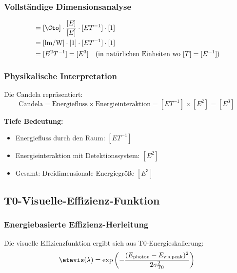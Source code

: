 	\subsubsection{Vollständige Dimensionsanalyse}
	\label{subsubsec:candela_vollstaendige_dimensional}
	
	\begin{align}
		[I_{\text{T0}}] &= [\Cto] \cdot \frac{[E]}{[E]} \cdot [E T^{-1}] \cdot [1] \\
		&= [\text{lm/W}] \cdot [1] \cdot [E T^{-1}] \cdot [1] \\
		&= [E^2 T^{-1}] = [E^3] \quad \text{(in natürlichen Einheiten wo } [T] = [E^{-1}])
		\label{eq:candela_dimensionsanalyse}
	\end{align}
	
	\subsubsection{Physikalische Interpretation}
	\label{subsubsec:candela_physikalische_interpretation}
	
	Die Candela repräsentiert:
	\begin{equation}
		\text{Candela} = \text{Energiefluss} \times \text{Energieinteraktion} = [E T^{-1}] \times [E^2] = [E^3]
		\label{eq:candela_interpretation}
	\end{equation}
	
	\textbf{Tiefe Bedeutung:}
	\begin{itemize}
		\item Energiefluss durch den Raum: $[E T^{-1}]$
		\item Energieinteraktion mit Detektionssystem: $[E^2]$
		\item Gesamt: Dreidimensionale Energiegröße $[E^3]$
	\end{itemize}
	
	\subsection{T0-Visuelle-Effizienz-Funktion}
	\label{subsec:t0_visuelle_effizienz}
	
	\subsubsection{Energiebasierte Effizienz-Herleitung}
	\label{subsubsec:energie_effizienz_herleitung}
	
	Die visuelle Effizienzfunktion ergibt sich aus T0-Energieskalierung:
	\begin{equation}
		\etavis(\lambda) = \exp\left(-\frac{(E_{\text{photon}} - E_{\text{vis,peak}})^2}{2\sigma_{\text{T0}}^2}\right)
		\label{eq:t0_visuelle_effizienz}
	\end{equation}
	
